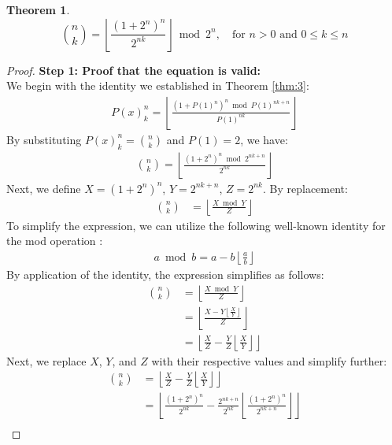 \documentclass{article}
\theoremstyle{plain}
\newtheorem{thm}{Theorem}
\begin{document}
\begin{thm}
\label{thm:4}
\begin{equation}
\binom{n}{k} = \left\lfloor\frac{(1 + 2^{n})^{n}}{2^{n k}}\right\rfloor \bmod{2^{n}}, \quad \text{for } n > 0 \text{ and } 0 \leq k \leq n
\end{equation}
\end{thm}
\begin{proof}
\textbf{Step 1: Proof that the equation is valid:} \\
We begin with the identity we established in Theorem \ref{thm:3}:
\begin{align}
 P(x)^{n}_{k} = \left\lfloor\frac{(1 + P(1)^{n})^{n} \bmod P(1)^{n k + n}}{P(1)^{n k}}\right\rfloor
\end{align}
By substituting $P(x)^{n}_{k} = \binom{n}{k}$ and $P(1) = 2$, we have: 
\begin{align}
\binom{n}{k} = \left\lfloor\frac{(1 + 2^{n})^{n} \bmod 2^{n k + n}}{2^{n k}}\right\rfloor
\end{align}
Next, we define $X = (1 + 2^{n})^{n}$, $Y = 2^{n k + n}$, $Z = 2^{n k}$. By replacement:
\begin{align}
\binom{n}{k} &= \left\lfloor\frac{X \bmod Y}{Z}\right\rfloor
\end{align}
To simplify the expression, we can utilize the following well-known identity for the mod operation \cite{niven2008introduction}:
\begin{align}
\label{modidentity}
a \bmod{b} = a - b \left\lfloor \frac{a}{b} \right\rfloor
\end{align}
By application of the identity, the expression simplifies as follows:
\begin{align}
\binom{n}{k} &= \left\lfloor\frac{X \bmod Y}{Z}\right\rfloor\\ &= \left\lfloor\frac{X - Y \left\lfloor \frac{X}{Y} \right\rfloor}{Z}\right\rfloor\\ &= \left\lfloor\frac{X}{Z} - \frac{Y}{Z} \left\lfloor \frac{X}{Y} \right\rfloor\right\rfloor
\end{align}
Next, we replace $X$, $Y$, and $Z$ with their respective values and simplify further:
\begin{align}
\binom{n}{k} &= \left\lfloor\frac{X}{Z} - \frac{Y}{Z} \left\lfloor \frac{X}{Y} \right\rfloor\right\rfloor \\ 
&= \left\lfloor\frac{(1 + 2^{n})^{n}}{2^{n k}} - \frac{2^{n k + n}}{2^{n k}} \left\lfloor \frac{(1 + 2^{n})^{n}}{2^{n k + n}} \right\rfloor\right\rfloor \\

\end{align}
\end{proof}
\end{document}
